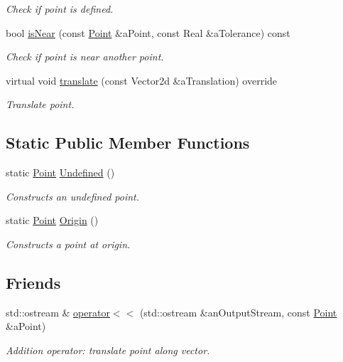 \begin{DoxyCompactItemize}
\begin{DoxyCompactList}\small\item\em Check if point is defined. \end{DoxyCompactList}\item 
bool \hyperlink{classlibrary_1_1math_1_1geom_1_1d2_1_1objects_1_1_point_aeec1bab241792dc6b6091d9cac36d02e}{is\+Near} (const \hyperlink{classlibrary_1_1math_1_1geom_1_1d2_1_1objects_1_1_point}{Point} \&a\+Point, const Real \&a\+Tolerance) const
\begin{DoxyCompactList}\small\item\em Check if point is near another point. \end{DoxyCompactList}\item 
virtual void \hyperlink{classlibrary_1_1math_1_1geom_1_1d2_1_1objects_1_1_point_a8e17705a1762fdfdcbed68881afca245}{translate} (const Vector2d \&a\+Translation) override
\begin{DoxyCompactList}\small\item\em Translate point. \end{DoxyCompactList}\end{DoxyCompactItemize}
\subsection*{Static Public Member Functions}
\begin{DoxyCompactItemize}
\item 
static \hyperlink{classlibrary_1_1math_1_1geom_1_1d2_1_1objects_1_1_point}{Point} \hyperlink{classlibrary_1_1math_1_1geom_1_1d2_1_1objects_1_1_point_a110a5bba9399abc5408f6c34306040c6}{Undefined} ()
\begin{DoxyCompactList}\small\item\em Constructs an undefined point. \end{DoxyCompactList}\item 
static \hyperlink{classlibrary_1_1math_1_1geom_1_1d2_1_1objects_1_1_point}{Point} \hyperlink{classlibrary_1_1math_1_1geom_1_1d2_1_1objects_1_1_point_ac372ec5b87ab91d58dc515eda2f0fa75}{Origin} ()
\begin{DoxyCompactList}\small\item\em Constructs a point at origin. \end{DoxyCompactList}\end{DoxyCompactItemize}
\subsection*{Friends}
\begin{DoxyCompactItemize}
\item 
std\+::ostream \& \hyperlink{classlibrary_1_1math_1_1geom_1_1d2_1_1objects_1_1_point_ac6c8450721254f3cefdea7dcdd5f5001}{operator$<$$<$} (std\+::ostream \&an\+Output\+Stream, const \hyperlink{classlibrary_1_1math_1_1geom_1_1d2_1_1objects_1_1_point}{Point} \&a\+Point)
\begin{DoxyCompactList}\small\item\em Addition operator\+: translate point along vector. \end{DoxyCompactList}\end{DoxyCompactItemize}


